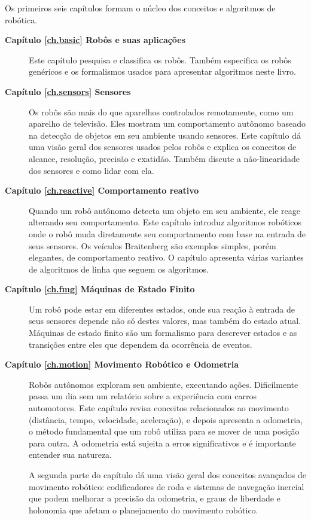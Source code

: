 Os primeiros seis capítulos formam o núcleo dos conceitos e algoritmos de robótica.
\begin{description}
\item [\textbf{Capítulo \ref{ch.basic} Robôs e suas aplicações}] Este capítulo pesquisa e classifica os robôs. Também especifica os robôs genéricos e os formalismos usados para apresentar algoritmos neste livro.

\item [\textbf{Capítulo \ref{ch.sensors} Sensores}] Os robôs são mais do que aparelhos controlados remotamente, como um aparelho de televisão. Eles mostram um comportamento autônomo baseado na detecção de objetos em seu ambiente usando sensores. Este capítulo dá uma visão geral dos sensores usados pelos robôs e explica os conceitos de alcance, resolução, precisão e exatidão. Também discute a não-linearidade dos sensores e como lidar com ela.

\item [\textbf{Capítulo \ref{ch.reactive} Comportamento reativo}] Quando um robô autônomo detecta um objeto em seu ambiente, ele reage alterando seu comportamento. Este capítulo introduz algoritmos robóticos onde o robô muda diretamente seu comportamento com base na entrada de seus sensores. Os veículos Braitenberg são exemplos simples, porém elegantes, de comportamento reativo. O capítulo apresenta várias variantes de algoritmos de linha que seguem os algoritmos.

\item [\textbf{Capítulo \ref{ch.fmg} Máquinas de Estado Finito}] Um robô pode estar em diferentes estados, onde sua reação à entrada de seus sensores depende não só destes valores, mas também do estado atual. Máquinas de estado finito são um formalismo para descrever estados e as transições entre eles que dependem da ocorrência de eventos.

\item [\textbf{Capítulo \ref{ch.motion} Movimento Robótico e Odometria}] Robôs autônomos exploram seu ambiente, executando ações. Dificilmente passa um dia sem um relatório sobre a experiência com carros automotores. Este capítulo revisa conceitos relacionados ao movimento (distância, tempo, velocidade, aceleração), e depois apresenta a odometria, o método fundamental que um robô utiliza para se mover de uma posição para outra. A odometria está sujeita a erros significativos e é importante entender sua natureza.

A segunda parte do capítulo dá uma visão geral dos conceitos avançados de movimento robótico: codificadores de roda e sistemas de navegação inercial que podem melhorar a precisão da odometria, e graus de liberdade e holonomia que afetam o planejamento do movimento robótico.


\end{description}
